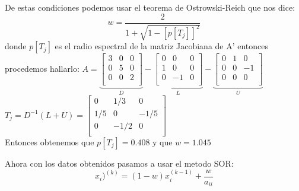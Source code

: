 \begin{frame}
    \begin{solution}
       De estas condiciones podemos usar el teorema de Ostrowski-Reich que nos dice:
        \begin{equation*}
            w=\frac{2}{1+\sqrt{1-[p[T_{j}]]^{2}}}
        \end{equation*}
        donde \begin{math}
            p[T_{j}]
        \end{math}
        es el radio espectral de la matriz Jacobiana de A'
    entonces procedemos hallarlo:
        \begin{math}
          A=  
        \underbrace{ \begin{bmatrix}
        3 & 0 & 0 \\
        0 & 5 & 0 \\
        0 & 0 & 2 \\
        \end{bmatrix}}_{\displaystyle D}
        -
        \underbrace{\begin{bmatrix}
        0 & 0 & 0 \\
        1 & 0 & 0 \\
        0 & -1 & 0 \\
        \end{bmatrix}}_{\displaystyle L}
        -
        \underbrace{\begin{bmatrix}
        0 & 1 & 0 \\
        0 & 0 & -1 \\
        0 & 0 & 0 \\
        \end{bmatrix}}_{\displaystyle U}
        
        \end{math} 
        \begin{math}
            T_{j}=D^{-1}(L+U)
        =\begin{bmatrix}
            0 & 1/3 & 0 \\
            1/5 & 0 & -1/5 \\
            0 & -1/2 & 0 \\
            \end{bmatrix}
        \end{math}
        \\Entonces obtenemos que
        \begin{math}
            p[T_{j}]=0.408
        \end{math} 
        y que 
        \begin{math}
            w=1.045
        \end{math}
        
    \end{solution}
\end{frame}

\begin{frame}

    \begin{solution}
      Ahora con los datos obtenidos pasamos a usar el metodo SOR:
      \begin{equation}
          x_{i})^(k)=(1-w) x_{i}^(k-1)+\frac{w}{a_{ii}}
      \end{equation}
    \end{solution}
    
\end{frame}